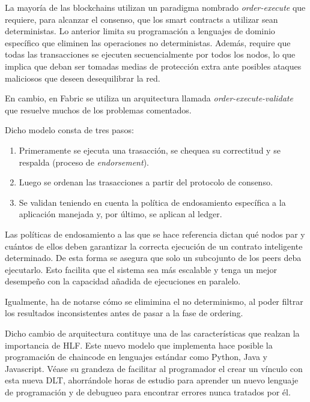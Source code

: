 La mayor\'ia de las blockchains utilizan un paradigma nombrado \emph{order-execute} que requiere, para alcanzar el consenso, que los smart contracts a utilizar sean deterministas. Lo anterior limita su programaci\'on a lenguajes de dominio espec\'ifico que eliminen las operaciones no deterministas. Adem\'as, require que todas las transacciones se ejecuten secuencialmente por todos los nodos, lo que implica que deban ser tomadas medias de protecci\'on extra ante posibles ataques maliciosos que deseen desequilibrar la red.

En cambio, en Fabric se utiliza un arquitectura llamada \emph{order-execute-validate} que resuelve muchos de los problemas comentados.

Dicho modelo consta de tres pasos:
\begin{enumerate}
	\item Primeramente se ejecuta una trasacci\'on, se chequea su correctitud y se respalda (proceso de \emph{endorsement}).
	
	\item Luego se ordenan las trasacciones a partir del protocolo de consenso.
	
	\item Se validan teniendo en cuenta la pol\'itica de endosamiento espec\'ifica a la aplicaci\'on manejada y, por \'ultimo, se aplican al ledger.
\end{enumerate}

Las pol\'iticas de endosamiento a las que se hace referencia dictan qu\'e nodos par y cu\'antos de ellos deben garantizar la correcta ejecuci\'on de un contrato inteligente determinado. De esta forma se asegura que solo un subcojunto de los peers deba ejecutarlo. Esto facilita que el sistema sea m\'as escalable y tenga un mejor desempe\~no con la capacidad a\~nadida de ejecuciones en paralelo.

Igualmente, ha de notarse c\'omo se elimimina el no determinismo, al poder filtrar los resultados inconsistentes antes de pasar a la fase de ordering.

Dicho cambio de arquitectura contituye una de las caracter\'isticas que realzan la importancia de HLF. Este nuevo modelo que implementa hace posible la programaci\'on de chaincode en lenguajes est\'andar como Python, Java y Javascript. V\'ease su grandeza de facilitar al programador el crear un v\'inculo con esta nueva DLT, ahorr\'andole horas de estudio para aprender un nuevo lenguaje de programaci\'on y de debugueo para encontrar errores nunca tratados por \'el.

